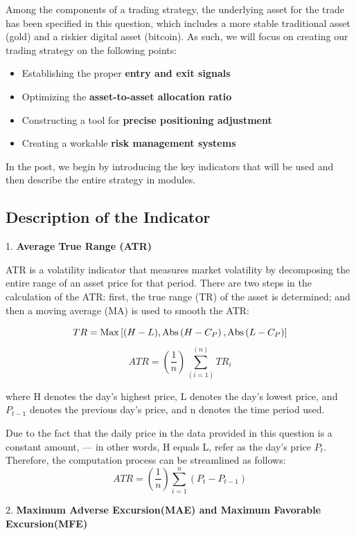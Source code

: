 \documentclass{mcmthesis}
\begin{document}
Among the components of a trading strategy, the underlying asset for the trade has been specified in this question, which includes a more stable traditional asset (gold) and a riskier digital asset (bitcoin). As such, we will focus on creating our trading strategy on the following points:
\begin{itemize}
	\item Establishing the proper \textbf{entry and exit signals}
	\item Optimizing the \textbf{asset-to-asset allocation ratio}
	\item Constructing a tool for \textbf{precise positioning adjustment}
	\item Creating a workable \textbf{risk management systems}
\end{itemize}

In the post, we begin by introducing the key indicators that will be used and then describe the entire strategy in modules.

\subsection{Description of the Indicator}
1. \textbf{Average True Range (ATR)}

ATR is a volatility indicator that measures market volatility by decomposing the entire range of an asset price for that period\cite{ATR}. There are two steps in the calculation of the ATR: first, the true range (TR) of the asset is determined; and then a moving average (MA) is used to smooth the ATR:

$$
	\centering
	TR=\operatorname{Max}\left[(H-L), \operatorname{Abs}\left(H-C_{P}\right), \operatorname{Abs}\left(L-C_{P}\right)\right]  
$$
$$
	ATR=\left(\frac{1}{n}\right) \sum_{(i=1)}^{(n)} T R_{i}
$$

where H denotes the day's highest price, L denotes the day's lowest price, and $P_{t-1}$ denotes the previous day's price, and n denotes the time period used. 

Due to the fact that the daily price in the data provided in this question is a constant amount, — in other words, H equals L, refer as the day's price $P_{t}$. Therefore, the computation process can be streamlined as follows:
\begin{equation}
	ATR=\left(\frac{1}{n}\right) \sum_{i=1}^{n} (P_{t}-P_{t-1})
\end{equation}

2.  \textbf{Maximum Adverse Excursion(MAE) and Maximum Favorable Excursion(MFE)}
\end{document}

